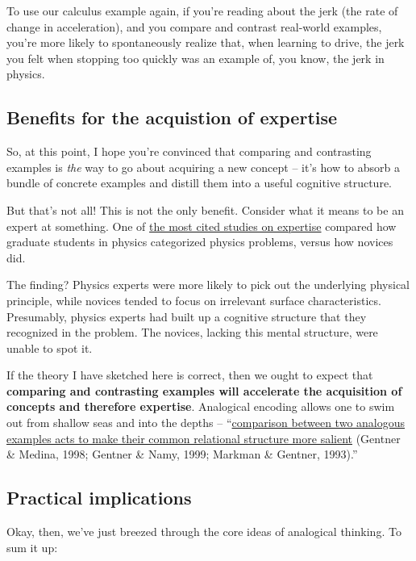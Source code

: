 To use our calculus example again, if you're reading about the jerk (the
rate of change in acceleration), and you compare and contrast real-world
examples, you're more likely to spontaneously realize that, when
learning to drive, the jerk you felt when stopping too quickly was an
example of, you know, the jerk in physics.

\subsection{Benefits for the acquistion of
expertise}\label{benefits-for-the-acquistion-of-expertise}

So, at this point, I hope you're convinced that comparing and
contrasting examples is \emph{the} way to go about acquiring a new
concept -- it's how to absorb a bundle of concrete examples and distill
them into a useful cognitive structure.

But that's not all! This is not the only benefit. Consider what it means
to be an expert at something. One of
\href{http://eric.ed.gov/?id=ED215899}{the most cited studies on
expertise} compared how graduate students in physics categorized physics
problems, versus how novices did.

The finding? Physics experts were more likely to pick out the underlying
physical principle, while novices tended to focus on irrelevant surface
characteristics. Presumably, physics experts had built up a cognitive
structure that they recognized in the problem. The novices, lacking this
mental structure, were unable to spot it.

If the theory I have sketched here is correct, then we ought to expect
that \textbf{comparing and contrasting examples will accelerate the
acquisition of concepts and therefore expertise}. Analogical encoding
allows one to swim out from shallow seas and into the depths --
``\href{http://onlinelibrary.wiley.com/doi/10.1111/j.1551-6709.2009.01070.x/full}{comparison
between two analogous examples acts to make their common relational
structure more salient} (Gentner \& Medina, 1998; Gentner \& Namy, 1999;
Markman \& Gentner, 1993).''

\subsection{Practical implications}\label{practical-implications}

Okay, then, we've just breezed through the core ideas of analogical
thinking. To sum it up:


